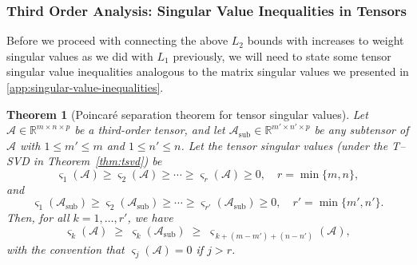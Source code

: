 \documentclass{article}
\theoremstyle{plain}
\newtheorem{theorem}{Theorem}
\theoremstyle{definition}
\theoremstyle{remark}
\begin{document}
\subsubsection{Third Order Analysis: Singular Value Inequalities in Tensors}

Before we proceed with connecting the above $L_2$ bounds with increases to weight singular values as we did with $L_1$ previously, we will need to state some tensor singular value inequalities analogous to the matrix singular values we presented in \cref{app:singular-value-inequalities}. 

\begin{theorem}[Poincaré separation theorem for tensor singular values]
\label{thm:tubal-poincare}
Let $\mathcal{A}\in\mathbb{R}^{m\times n\times p}$ be a third-order tensor, and let 
$\mathcal{A}_{\mathrm{sub}}\in\mathbb{R}^{m'\times n'\times p}$ be any subtensor of $\mathcal{A}$ 
with $1 \le m' \le m$ and $1 \le n' \le n$. 
Let the tensor singular values (under the T--SVD in Theorem~\ref{thm:tsvd}) be
\[
\varsigma_1(\mathcal{A}) \ge \varsigma_2(\mathcal{A}) \ge \cdots \ge \varsigma_{r}(\mathcal{A}) \ge 0,
\quad r = \min\{m,n\},
\]
and
\[
\varsigma_1(\mathcal{A}_{\mathrm{sub}}) \ge \varsigma_2(\mathcal{A}_{\mathrm{sub}}) \ge \cdots 
\ge \varsigma_{r'}(\mathcal{A}_{\mathrm{sub}}) \ge 0,
\quad r' = \min\{m',n'\}.
\]
Then, for all $k = 1,\dots, r'$, we have
\begin{equation}
\label{eq:tubal-sep-simple}
\varsigma_k(\mathcal{A})
\;\ge\;
\varsigma_k(\mathcal{A}_{\mathrm{sub}})
\;\ge\;
\varsigma_{\,k + (m - m') + (n - n')}(\mathcal{A}),
\end{equation}
with the convention that $\varsigma_j(\mathcal{A}) = 0$ if $j > r$.
\end{theorem}
\end{document}
